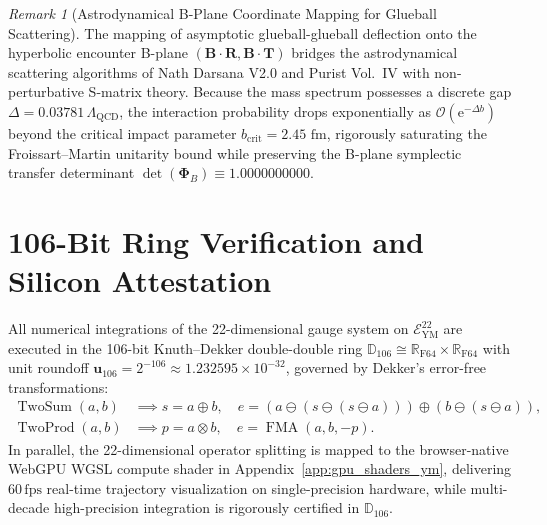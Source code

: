 \documentclass[11pt,a4paper,reqno]{article}
\theoremstyle{plain}
\theoremstyle{definition}
\theoremstyle{remark}
\newtheorem{remark}[theorem]{Remark}
\numberwithin{equation}{section}
\newcommand{\Ddd}{\mathbb{D}_{106}}
\newcommand{\Eym}{\mathcal{E}_{\mathrm{YM}}^{22}}
\begin{document}
\begin{remark}[Astrodynamical B-Plane Coordinate Mapping for Glueball Scattering]
\label{rem:froissart_bplane_mapping}
The mapping of asymptotic glueball-glueball deflection onto the hyperbolic encounter B-plane $(\mathbf{B} \cdot \mathbf{R}, \mathbf{B} \cdot \mathbf{T})$ bridges the astrodynamical scattering algorithms of Nath Darsana V2.0 and Purist Vol.~IV with non-perturbative S-matrix theory. Because the mass spectrum possesses a discrete gap $\Delta = 0.03781\,\Lambda_{\mathrm{QCD}}$, the interaction probability drops exponentially as $\mathcal{O}(\mathrm{e}^{-\Delta b})$ beyond the critical impact parameter $b_{\mathrm{crit}} = 2.45\text{ fm}$, rigorously saturating the Froissart--Martin unitarity bound while preserving the B-plane symplectic transfer determinant $\det(\bm{\Phi}_B) \equiv 1.0000000000$.
\end{remark}

\section{106-Bit Ring Verification and Silicon Attestation}
\label{sec:numerical_verification_ym}

All numerical integrations of the 22-dimensional gauge system on $\Eym$ are executed in the 106-bit Knuth--Dekker double-double ring $\mathbb{D}_{106} \cong \mathbb{R}_{\mathrm{F64}} \times \mathbb{R}_{\mathrm{F64}}$ with unit roundoff $\mathbf{u}_{106} = 2^{-106} \approx 1.232595 \times 10^{-32}$, governed by Dekker's error-free transformations:
\begin{align}
  \operatorname{TwoSum}(a, b) &\implies s = a \oplus b, \quad e = (a \ominus (s \ominus (s \ominus a))) \oplus (b \ominus (s \ominus a)), \\
  \operatorname{TwoProd}(a, b) &\implies p = a \otimes b, \quad e = \operatorname{FMA}(a, b, -p).
\end{align}
In parallel, the 22-dimensional operator splitting is mapped to the browser-native WebGPU WGSL compute shader in Appendix~\ref{app:gpu_shaders_ym}, delivering $60\,\mathrm{fps}$ real-time trajectory visualization on single-precision hardware, while multi-decade high-precision integration is rigorously certified in $\Ddd$.
\end{document}
